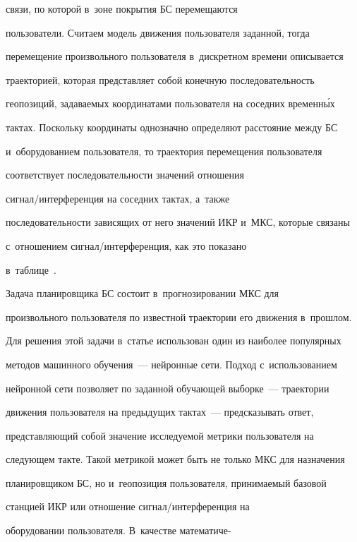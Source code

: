 связи, по которой в~зоне покрытия БС перемещаются 


пользователи. Считаем модель движения пользователя заданной, тогда 


перемещение произвольного пользователя в~дискретном времени описывается 


траекторией, которая пред\-став\-ля\-ет собой конечную последовательность 


геопозиций, задаваемых координатами пользователя на соседних временн\'{ы}х 


тактах. Поскольку координаты однозначно определяют расстояние между БС 


и~оборудованием пользователя, то траектория перемещения пользователя 


соответствует последовательности значений отношения 


сиг\-нал\!/\!ин\-тер\-фе\-рен\-ция на соседних тактах, а~также 


последовательности за\-ви\-ся\-щих от него значений ИКР и~МКС, которые связаны 


с~отношением сиг\-нал\!/\!ин\-тер\-фе\-рен\-ция, как это показано 


в~таблице~\cite{1-bob}. 





  Задача планировщика БС состоит в~прогнозировании МКС для 


произвольного пользователя по известной траектории его движения в~прошлом. 


Для решения этой задачи в~статье использован один из наиболее популярных 


методов машинного обучения~--- нейронные сети. Подход с~использованием 


нейронной сети позволяет по заданной обучающей выборке~--- траектории 


движения пользователя на предыдущих тактах~--- предсказывать ответ, 


представляющий собой значение исследуемой метрики пользователя на 


следующем такте. Такой метрикой может быть не только МКС для назначения 


планировщиком БС, но и~геопозиция пользователя, принимаемый базовой 


станцией ИКР или отношение сиг\-нал\!/\!ин\-тер\-фе\-рен\-ция на 


оборудовании пользователя. В~качестве математиче-\linebreak\vspace*{-12pt}





